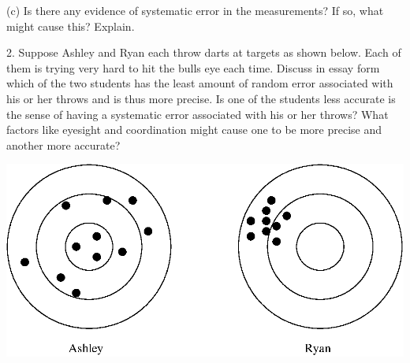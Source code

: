 (c) Is there any evidence of systematic error in the measurements? If so, what
might cause this? Explain.
\vspace{20mm}

2. Suppose Ashley and Ryan each throw darts at targets as shown below. Each
of them is trying very hard to hit the bulls eye each time. Discuss in essay
form which of the two students has the least amount of random
error associated with his
or her throws and is thus more precise. Is one of the students less accurate
is the sense of having a systematic error associated with his or her throws?
What factors like eyesight and coordination might cause one to be more precise
and another more accurate?

\vspace{0.3cm}
{\par\centering \includegraphics{measurement_uncertainty_fig1.eps} \par}
\vspace{0.3cm}

